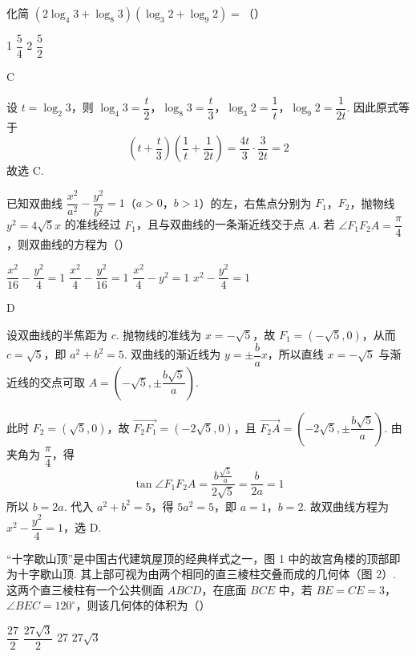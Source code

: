 \begin{problem}
化简 \(\left(2\log_4 3+\log_8 3\right)\left(\log_3 2+\log_9 2\right)=\)（\quad）

\choices
    {1}
    {\(\dfrac{5}{4}\)}
    {2}
    {\(\dfrac{5}{2}\)}
\end{problem}

\begin{answer}
C
\end{answer}

\begin{solution}
设 \(t=\log_2 3\)，则 \(\log_4 3=\dfrac{t}{2}\)，\(\log_8 3=\dfrac{t}{3}\)，\(\log_3 2=\dfrac{1}{t}\)，\(\log_9 2=\dfrac{1}{2t}\). 因此原式等于
\[
\left(t+\dfrac{t}{3}\right)\left(\dfrac{1}{t}+\dfrac{1}{2t}\right)=\dfrac{4t}{3}\cdot\dfrac{3}{2t}=2
\]
故选 C.
\end{solution}

\begin{problem}
已知双曲线 \(\dfrac{x^2}{a^2}-\dfrac{y^2}{b^2}=1\)（\(a>0\)，\(b>1\)）的左，右焦点分别为 \(F_1\)，\(F_2\)，抛物线 \(y^2=4\sqrt{5}x\) 的准线经过 \(F_1\)，且与双曲线的一条渐近线交于点 \(A\). 若 \(\angle F_1F_2A=\dfrac{\pi}{4}\)，则双曲线的方程为（\quad）

\choices
    {\(\dfrac{x^2}{16}-\dfrac{y^2}{4}=1\)}
    {\(\dfrac{x^2}{4}-\dfrac{y^2}{16}=1\)}
    {\(\dfrac{x^2}{4}-y^2=1\)}
    {\(x^2-\dfrac{y^2}{4}=1\)}
\end{problem}

\begin{answer}
D
\end{answer}

\begin{solution}
设双曲线的半焦距为 \(c\). 抛物线的准线为 \(x=-\sqrt{5}\)，故 \(F_1=(-\sqrt{5},0)\)，从而 \(c=\sqrt{5}\)，即 \(a^2+b^2=5\). 双曲线的渐近线为 \(y=\pm\dfrac{b}{a}x\)，所以直线 \(x=-\sqrt{5}\) 与渐近线的交点可取 \(A=(-\sqrt{5},\pm\dfrac{b\sqrt{5}}{a})\).

此时 \(F_2=(\sqrt{5},0)\)，故 \(\overrightarrow{F_2F_1}=(-2\sqrt{5},0)\)，且 \(\overrightarrow{F_2A}=(-2\sqrt{5},\pm\dfrac{b\sqrt{5}}{a})\). 由夹角为 \(\dfrac{\pi}{4}\)，得
\[
\tan\angle F_1F_2A=\dfrac{b\frac{\sqrt{5}}{a}}{2\sqrt{5}}=\dfrac{b}{2a}=1
\]
所以 \(b=2a\). 代入 \(a^2+b^2=5\)，得 \(5a^2=5\)，即 \(a=1\)，\(b=2\). 故双曲线方程为 \(x^2-\dfrac{y^2}{4}=1\)，选 D.
\end{solution}

\begin{problem}
“十字歇山顶”是中国古代建筑屋顶的经典样式之一，图 1 中的故宫角楼的顶部即为十字歇山顶. 其上部可视为由两个相同的直三棱柱交叠而成的几何体（图 2）. 这两个直三棱柱有一个公共侧面 \(ABCD\)，在底面 \(BCE\) 中，若 \(BE=CE=3\)，\(\angle BEC=120^{\circ}\)，则该几何体的体积为（\quad）


\choices
    {\(\dfrac{27}{2}\)}
    {\(\dfrac{27\sqrt{3}}{2}\)}
    {27}
    {\(27\sqrt{3}\)}
\end{problem}

